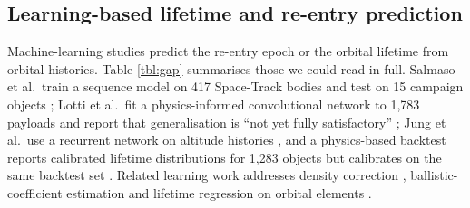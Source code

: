 \documentclass[3p,times]{elsarticle}
\begin{document}
\subsection{Learning-based lifetime and re-entry
prediction}\label{learning-based-lifetime-and-re-entry-prediction}

Machine-learning studies predict the re-entry epoch or the orbital
lifetime from orbital histories. Table \ref{tbl:gap} summarises those we
could read in full. Salmaso et al.~train a sequence model on 417
Space-Track bodies and test on 15 campaign objects
\citep{salmaso2023machine}; Lotti et al.~fit a physics-informed
convolutional network to 1,783 payloads and report that generalisation
is ``not yet fully satisfactory'' \citep{lotti2025exploring}; Jung et
al.~use a recurrent network on altitude histories
\citep{jung2021recurrent}, and a physics-based backtest reports
calibrated lifetime distributions for 1,283 objects but calibrates on
the same backtest set \citep{shambaugh2026validation}. Related learning
work addresses density correction \citep{licata2022machine},
ballistic-coefficient estimation \citep{andaristiyan2025ballistic} and
lifetime regression on orbital elements
\citep{li2023backpropagation, peng2020machine}.
\end{document}
